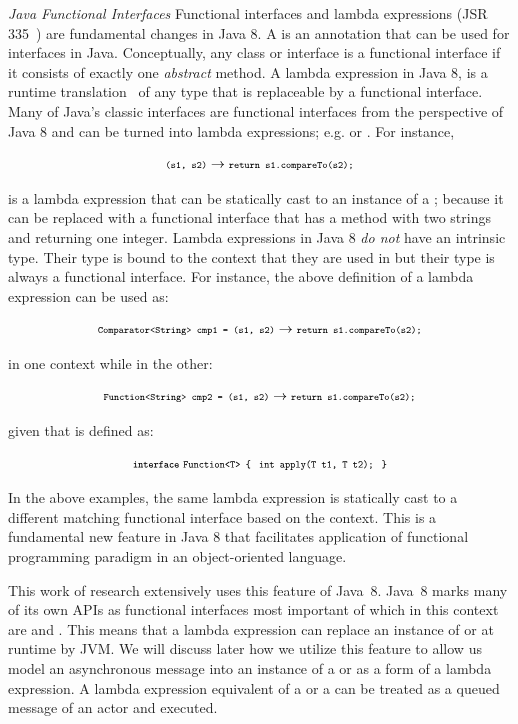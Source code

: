 \textsl{Java Functional Interfaces}
Functional interfaces and lambda expressions (JSR 335~\cite{jsr335}) are fundamental changes in Java 8. 
A  is an annotation that can be used for interfaces in Java.
Conceptually, any class or interface is a functional interface if it consists of exactly one \emph{abstract} method.
A lambda expression in Java 8, is a runtime translation~\cite{jsr335:lambda:translation} of any type that is replaceable by a functional interface.
Many of Java's classic interfaces are functional interfaces from the perspective of Java 8 and can be turned into lambda expressions; 
e.g.  or .
For instance,

$$
{\scriptsize\texttt{(s1, s2)}} \to {\scriptsize\texttt{return s1.compareTo(s2);}}
$$

is a lambda expression that can be statically cast to an instance of a ;
because it can be replaced with a functional interface that has a method with two strings and returning one integer.
Lambda expressions in Java 8 \emph{do not} have an intrinsic type.
Their type is bound to the context that they are used in but their type is always a functional interface.
For instance, the above definition of a lambda expression can be used as:

$$
{\scriptsize\texttt{Comparator<String> cmp1 = (s1, s2)}} \to {\scriptsize\texttt{return s1.compareTo(s2);}}
$$

in one context while in the other:

$$
{\scriptsize\texttt{Function<String> cmp2 = (s1, s2)}} \to {\scriptsize\texttt{return s1.compareTo(s2);}}
$$

given that  is defined as:

$$
\textbf{\scriptsize\texttt{interface}} \; {\scriptsize\texttt{Function<T> \{\;
  int apply(T t1, T t2); \;\}}}
$$

In the above examples, the same lambda expression is statically cast to a different matching functional interface based on the context.
This is a fundamental new feature in Java 8 that facilitates application of functional programming paradigm in an object-oriented language.

This work of research extensively uses this feature of Java~8.
Java~8 marks many of its own APIs as functional interfaces most important of which in this context are  and .
This means that a lambda expression can replace an instance of  or  at runtime by JVM.
We will discuss later how we utilize this feature to allow us model an asynchronous message into an instance of a  or  as a form of a lambda expression.
A lambda expression equivalent of a  or a  can be treated as a queued message of an actor and executed.

